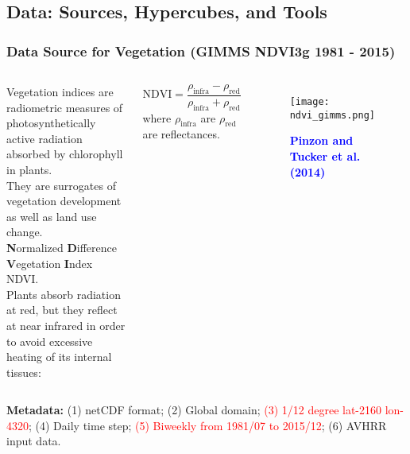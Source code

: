 \documentclass[11pt]{beamer}
\newcommand{\citat}[2]{\textbf{\textcolor{blue}{#1 et al. (#2)}}}
\begin{document}
\subsection{Data: Sources, Hypercubes, and Tools}

\begin{frame}
  \frametitle{\normalsize{\textbf{
        Data Source for Vegetation (GIMMS NDVI3g 1981 - 2015)
  }}} 

  \scriptsize{
    
    \begin{columns}

      \textbullet \: Vegetation indices are radiometric
      measures of photosynthetically active radiation absorbed by chlorophyll in
      plants. \\

      \textbullet \:They are surrogates of vegetation development as well as
      land use change. \\

      \textbullet \: \textbf{N}ormalized \textbf{D}ifference \textbf{V}egetation
      \textbf{I}ndex NDVI. \\[0.10cm]  
      
      \textbullet \: Plants absorb radiation at red, but they reflect at near
      infrared in order to avoid excessive heating of its internal tissues:

      \begin{equation}
        \boxed{\text{NDVI} = \frac{\rho_{\text{infra}} -
          \rho_{\text{red}}}{\rho_{\text{infra}} + \rho_{\text{red}}} \nonumber}
      \end{equation} 
      where $\rho_{\text{infra}}$ are $\rho_{\text{red}}$ are reflectances. 
      

      \begin{figure}[h!]
        \centering
        \texttt{[image: ndvi\_gimms.png]}
        \caption*{\scriptsize{
            \citat{Pinzon and Tucker}{2014}
        }}
      \end{figure}
      
    \end{columns}

    \vspace{0.10cm}
    
    \textbf{\textbullet \: Metadata:} (1) netCDF format; (2) Global domain;
    \textcolor{red}{(3) 1/12 degree lat-2160 lon-4320}; (4) Daily time step;
    \textcolor{red}{(5) Biweekly from 1981/07 to 2015/12}; (6) AVHRR input data. 
   
  }
      
\end{frame}
\end{document}
